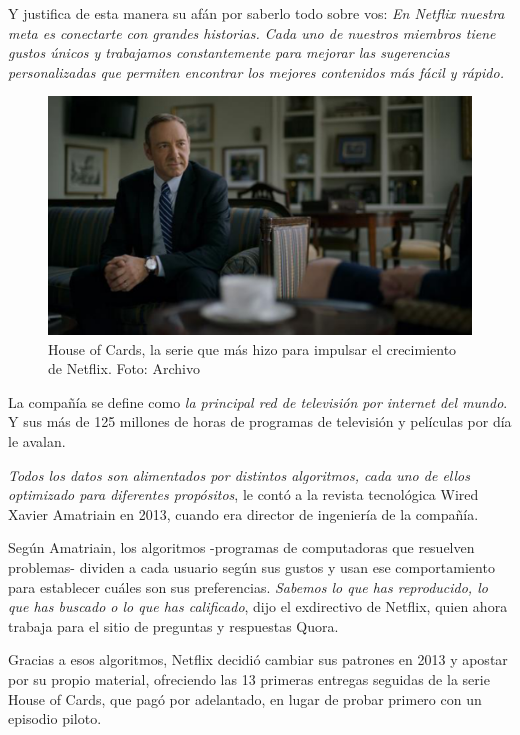 \documentclass[a4paper,10pt,twoside,final,spanish]{article}
\begin{document}
Y justifica de esta manera su afán por saberlo todo sobre vos: \textit{En Netflix nuestra meta es conectarte con grandes historias. Cada uno de nuestros miembros tiene gustos únicos y trabajamos constantemente para mejorar las sugerencias personalizadas que permiten encontrar los mejores contenidos más fácil y rápido.}
 
\begin{figure}[!htbp]
\centerline{\includegraphics{img3}}
\caption{House of Cards, la serie que más hizo para impulsar el crecimiento de Netflix. Foto: Archivo}
\label{fig:img3}
\end{figure}

La compañía se define como \textit{la principal red de televisión por internet del mundo}. Y sus más de 125 millones de horas de programas de televisión y películas por día le avalan.

\textit{Todos los datos son alimentados por distintos algoritmos, cada uno de ellos optimizado para diferentes propósitos}, le contó a la revista tecnológica Wired Xavier Amatriain en 2013, cuando era director de ingeniería de la compañía.

Según Amatriain, los algoritmos -programas de computadoras que resuelven problemas- dividen a cada usuario según sus gustos y usan ese comportamiento para establecer cuáles son sus preferencias. \textit{Sabemos lo que has reproducido, lo que has buscado o lo que has calificado}, dijo el exdirectivo de Netflix, quien ahora trabaja para el sitio de preguntas y respuestas Quora.

Gracias a esos algoritmos, Netflix decidió cambiar sus patrones en 2013 y apostar por su propio material, ofreciendo las 13 primeras entregas seguidas de la serie House of Cards, que pagó por adelantado, en lugar de probar primero con un episodio piloto.
\end{document}

